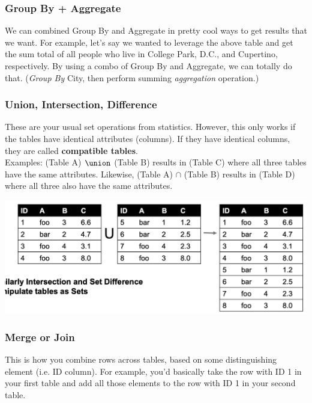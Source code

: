 \documentclass[english, 10pt]{article}
\begin{document}
\subsubsection{Group By + Aggregate}

We can combined Group By and Aggregate in pretty cool ways to get results that we want. For example, let's say we wanted to leverage the above table and get the sum total of all people who live in College Park, D.C., and Cupertino, respectively. By using a combo of Group By and Aggregate, we can totally do that. (\textit{Group By} City, then perform summing \textit{aggregation} operation.)

\subsubsection{Union, Intersection, Difference}

These are your usual set operations from statistics. However, this only works if the tables have identical attributes (columns). If they have identical columns, they are called \textbf{compatible tables}.\\

Examples: (Table A) $\union$ (Table B) results in (Table C) where all three tables have the same attributes. Likewise, (Table A) $\cap$ (Table B) results in (Table D) where all three also have the same attributes.
\begin{center}
	\includegraphics[scale=0.4]{img/Union.png}
\end{center}
\subsubsection{Merge or Join}

This is how you combine rows across tables, based on some distinguishing element (i.e. ID column). For example, you'd basically take the row with ID 1 in your first table and add all those elements to the row with ID 1 in your second table.\\
\end{document}

